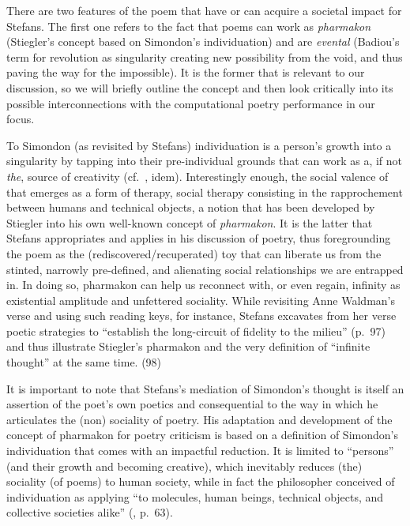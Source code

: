 There are two features of the poem that have or can acquire a societal
impact for Stefans. The first one refers to the fact that poems can work
as \emph{pharmakon} (Stiegler's concept based on Simondon's
individuation) and are \emph{evental} (Badiou's term for revolution as
singularity creating new possibility from the void, and thus paving the
way for the impossible). It is the former that is relevant to our
discussion, so we will briefly outline the concept and then look
critically into its possible interconnections with the computational
poetry performance in our focus.

To Simondon (as revisited by Stefans) individuation is a person's growth
into a singularity by tapping into their pre-individual grounds that can
work as a, if not \emph{the}, source of creativity
(cf.~\cite{stefans2017word}, idem). Interestingly enough, the social
valence of that emerges as a form of therapy, social therapy consisting
in the rapprochement between humans and technical objects, a notion that
has been developed by Stiegler into his own well-known concept of
\emph{pharmakon}. It is the latter that Stefans appropriates and applies
in his discussion of poetry, thus foregrounding the poem as the
(rediscovered/recuperated) toy that can liberate us from the stinted,
narrowly pre-defined, and alienating social relationships we are
entrapped in. In doing so, pharmakon can help us reconnect with, or even
regain, infinity as existential amplitude and unfettered sociality.
While revisiting Anne Waldman's verse and using such reading keys, for
instance, Stefans excavates from her verse poetic strategies to
``establish the long-circuit of fidelity to the milieu'' (p.~97) and
thus illustrate Stiegler's pharmakon and the very definition of
``infinite thought'' at the same time. (98)

It is important to note that Stefans's mediation of Simondon's thought
is itself an assertion of the poet's own poetics and consequential to
the way in which he articulates the (non) sociality of poetry. His
adaptation and development of the concept of pharmakon for poetry
criticism is based on a definition of Simondon's individuation that
comes with an impactful reduction. It is limited to ``persons'' (and
their growth and becoming creative), which inevitably reduces (the)
sociality (of poems) to human society, while in fact the philosopher
conceived of individuation as applying ``to molecules, human beings,
technical objects, and collective societies alike''
(\cite{schwarz2018umwelt}, p.~63).


